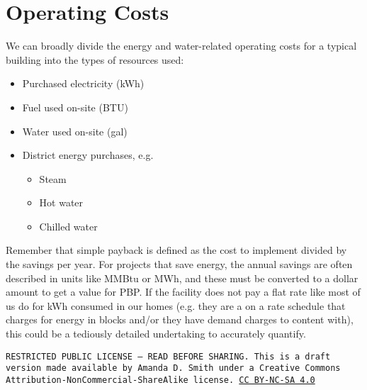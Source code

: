 \documentclass[10pt]{article}
\begin{document}
\section{Operating Costs}

We can broadly divide the energy and water-related operating costs for a typical building into the types of resources used:

\begin{itemize}
    \item Purchased electricity (kWh)
    \item Fuel used on-site (BTU)
    \item Water used on-site (gal)
    \item District energy purchases, e.g.
    \begin{itemize}
        \item Steam
        \item Hot water
        \item Chilled water
    \end{itemize}
\end{itemize}

Remember that simple payback is defined as the cost to implement divided by the savings per year. For projects that save energy, the annual savings are often described in units like MMBtu or MWh, and these must be converted to a dollar amount to get a value for PBP. If the facility does not pay a flat rate like most of us do for kWh consumed in our homes (e.g. they are a on a rate schedule that charges for energy in blocks and/or they have demand charges to content with), this could be a tediously detailed undertaking to accurately quantify.

\bigskip

\noindent
\texttt{\footnotesize RESTRICTED PUBLIC LICENSE --- READ BEFORE SHARING. This is a draft version made available by Amanda D. Smith under a Creative Commons Attribution-NonCommercial-ShareAlike license. 
\href{https://creativecommons.org/licenses/by-nc-sa/4.0/}{CC BY-NC-SA 4.0}}

\newpage
\printbibliography
\end{document}
